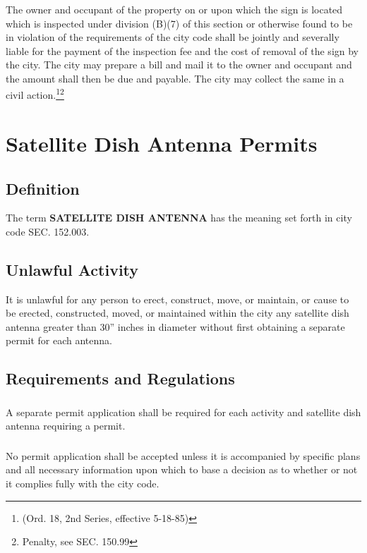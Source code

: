\subsubsection{}
The owner and occupant of the property on or upon which the sign is located which is inspected under division (B)(7) of this section or otherwise found to be in violation of the requirements of the city code shall be jointly and severally liable for the payment of the inspection fee and the cost of removal of the sign by the city. The city may prepare a bill and mail it to the owner and occupant and the amount shall then be due and payable. The city may collect the same in a civil action.\footnote{(Ord. 18, 2nd Series, effective 5-18-85)}\footnote{Penalty, see SEC. 150.99}

\section{Satellite Dish Antenna Permits}
\subsection{Definition}
The term \textbf{SATELLITE DISH ANTENNA} has the meaning set forth in city code SEC. 152.003.
\subsection{Unlawful Activity}
It is unlawful for any person to erect, construct, move, or maintain, or cause to be erected, constructed, moved, or maintained within the city any satellite dish antenna greater than 30” inches in diameter without first obtaining a separate permit for each antenna.
\subsection{Requirements and Regulations}
\subsubsection{}
A separate permit application shall be required for each activity and satellite dish antenna requiring a permit.
\subsubsection{}
No permit application shall be accepted unless it is accompanied by specific plans and all necessary information upon which to base a decision as to whether or not it complies fully with the city code.
